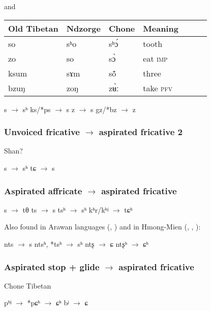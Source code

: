 \documentclass[oldfontcommands,oneside,a4paper,11pt]{article}
\newcommand{\ipa}[1]{{\phon \mbox{#1}}} %
\begin{document}
\citet{sun86ndzorge} and \citet{jacques14cone} 

\begin{table}[H] \centering
\begin{tabular}{lllllll}
\toprule
Old Tibetan& Ndzorge& Chone & Meaning \\
\midrule

so & \ipa{sʰo}& \ipa{sʰɔ́} &tooth \\
zo & \ipa{so}& \ipa{sɔ̀} &eat \textsc{imp} \\
ksum & \ipa{sɤm}& \ipa{sṍ} &three \\
bzuŋ & \ipa{zoŋ}& \ipa{zʉ̀ː} &take \textsc{pfv}\\
\bottomrule
\end{tabular}
\end{table}
\begin{exe}
\ex 
\glt *s $\rightarrow$ sʰ
\glt *ks/*ps $\rightarrow$ s
\glt *z $\rightarrow$ s
\glt *gz/*bz $\rightarrow$ z
\end{exe}

\subsubsection{Unvoiced  fricative $\rightarrow$ aspirated fricative 2}
Shan?
\begin{exe}
\ex 
\glt *s $\rightarrow$ sʰ
\glt *tɕ $\rightarrow$ s
\end{exe}

\subsubsection{Aspirated affricate $\rightarrow$ aspirated fricative}
\begin{exe}
\ex 
\glt *s $\rightarrow$ tθ
\glt *ts $\rightarrow$ s
\glt *tsʰ $\rightarrow$ sʰ
\glt *kʰr/kʰʲ $\rightarrow$ tɕʰ
\end{exe}
\citet{wang79miaoyu}

Also found in Arawan languages (\citealt{dixon04arawa}, \citealt{dienst05kulina}) and in Hmong-Mien (\citealt{wang79miaoyu}, \citealt{ratliff10protohm}, \citealt{carveth13aspirated}):
\begin{exe}
\ex 
\glt *nts $\rightarrow$ s
\glt *ntsʰ, *tsʰ $\rightarrow$ sʰ
\glt *ntʂ $\rightarrow$ ɕ
\glt *ntʂʰ $\rightarrow$ ɕʰ
\end{exe}


\subsubsection{Aspirated stop + glide $\rightarrow$ aspirated fricative}
Chone Tibetan
\begin{exe}
\ex 
\glt *pʰʲ $\rightarrow$ *pɕʰ $\rightarrow$ ɕʰ
\glt *bʲ $\rightarrow$ ɕ  
\end{exe}
\end{document}
